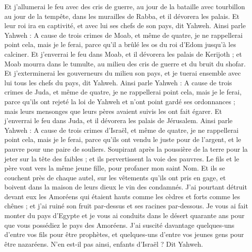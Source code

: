 \begin{multicols}{2}
Et j'allumerai le feu avec des cris de guerre, au jour de la bataille avec tourbillon au jour de la tempête, dans les murailles de Rabba, et il dévorera les palais. 
Et leur roi ira en captivité, et avec lui ses chefs de son pays, dit Yahweh.
\VerseOne{}Ainsi parle Yahweh : A cause de trois crimes de Moab, et même de quatre, je ne rappellerai point cela, mais je le ferai, parce qu'il a brûlé les os du roi d'Edom jusqu'à les calciner.
Et j'enverrai le feu dans Moab, et il dévorera les palais de Kerijoth ; et Moab mourra dans le tumulte, au milieu des cris de guerre et du bruit du shofar.
Et j'exterminerai les gouverneurs du milieu son pays, et je tuerai ensemble avec lui tous les chefs du pays, dit Yahweh.
Ainsi parle Yahweh : A cause de trois crimes de Juda, et même de quatre, je ne rappellerai point cela, mais je le ferai, parce qu'ils ont rejeté la loi de Yahweh et n'ont point gardé ses ordonnances ; mais leurs mensonges que leurs pères avaient suivis les ont fait égarer.  
Et j'enverrai le feu dans Juda, et il dévorera les palais de Jérusalem.
Ainsi parle Yahweh : A cause de trois crimes d'Israël, et même de quatre, je ne rappellerai point cela, mais je le ferai, parce qu'ils ont vendu le juste pour de l'argent, et le pauvre pour une paire de souliers.
Soupirant après la poussière de la terre pour la jeter sur la tête des faibles ; et ils pervertissent la voie des pauvres. Le fils et le père vont vers la même jeune fille, pour profaner mon saint Nom.
Et ils se couchent près de chaque autel, sur les vêtements qu'ils ont pris en gage, et boivent dans la maison de leurs dieux le vin des condamnés.
J'ai pourtant détruit devant eux les Amoréens qui étaient hauts comme les cèdres et forts comme les chênes ; et j'ai ruiné  son fruit par-dessus et ses racines par-dessous.
Je vous ai fait monter du pays d'Egypte et je vous ai conduits dans le désert quarante ans pour que vous possédiez le pays des Amoréens.
J'ai suscité davantage quelques-uns d'entre vos fils pour être prophètes, et quelques-uns d'entre vos jeunes gens pour être nazaréens. N'en est-il pas ainsi, enfants d'Israël ? Dit Yahweh.

\end{multicols}
